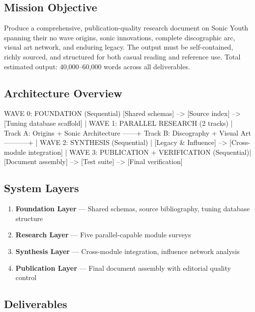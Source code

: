 \documentclass[11pt,letterpaper]{article}
\begin{document}
\subsection{Mission Objective}

Produce a comprehensive, publication-quality research document on Sonic Youth spanning their no wave origins, sonic innovations, complete discographic arc, visual art network, and enduring legacy. The output must be self-contained, richly sourced, and structured for both casual reading and reference use. Total estimated output: 40,000--60,000 words across all deliverables.

\subsection{Architecture Overview}

\begin{asciibox}
WAVE 0: FOUNDATION (Sequential)
  [Shared schemas] --> [Source index] --> [Tuning database scaffold]
                                              |
WAVE 1: PARALLEL RESEARCH (2 tracks)          |
  Track A: Origins + Sonic Architecture ------+
  Track B: Discography + Visual Art -----------+
                                               |
WAVE 2: SYNTHESIS (Sequential)                 |
  [Legacy & Influence] --> [Cross-module integration]
                                               |
WAVE 3: PUBLICATION + VERIFICATION (Sequential)|
  [Document assembly] --> [Test suite] --> [Final verification]
\end{asciibox}

\subsection{System Layers}

\begin{enumerate}[leftmargin=2em]
\item \textbf{Foundation Layer} --- Shared schemas, source bibliography, tuning database structure
\item \textbf{Research Layer} --- Five parallel-capable module surveys
\item \textbf{Synthesis Layer} --- Cross-module integration, influence network analysis
\item \textbf{Publication Layer} --- Final document assembly with editorial quality control
\end{enumerate}

\subsection{Deliverables}
\end{document}
